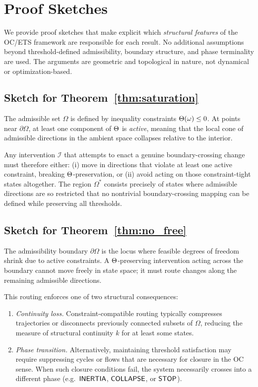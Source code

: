 ﻿\section{Proof Sketches}

We provide proof sketches that make explicit which \emph{structural features} of
the OC/ETS framework are responsible for each result.
No additional assumptions beyond threshold-defined admissibility, boundary
structure, and phase terminality are used.
The arguments are geometric and topological in nature, not dynamical or
optimization-based.

\subsection{Sketch for Theorem~\ref{thm:saturation}}

The admissible set $\Omega$ is defined by inequality constraints
$\Theta(\omega)\le 0$.
At points near $\partial\Omega$, at least one component of $\Theta$ is
\emph{active}, meaning that the local cone of admissible directions in the
ambient space collapses relative to the interior.

Any intervention $\mathcal{I}$ that attempts to enact a genuine
boundary-crossing change must therefore either:
(i) move in directions that violate at least one active constraint, breaking
$\Theta$-preservation, or
(ii) avoid acting on those constraint-tight states altogether.
The region $\Omega^\ast$ consists precisely of states where admissible
directions are so restricted that no nontrivial boundary-crossing mapping can be
defined while preserving all thresholds.

\subsection{Sketch for Theorem~\ref{thm:no_free}}

The admissibility boundary $\partial\Omega$ is the locus where feasible degrees
of freedom shrink due to active constraints.
A $\Theta$-preserving intervention acting across the boundary cannot move
freely in state space; it must route changes along the remaining admissible
directions.

This routing enforces one of two structural consequences:
\begin{enumerate}
\item \emph{Continuity loss.}
Constraint-compatible routing typically compresses trajectories or disconnects
previously connected subsets of $\Omega$, reducing the measure of structural
continuity $k$ for at least some states.
\item \emph{Phase transition.}
Alternatively, maintaining threshold satisfaction may require suppressing
cycles or flows that are necessary for closure in the OC sense.
When such closure conditions fail, the system necessarily crosses into a
different phase (e.g.\ $\mathsf{INERTIA}$, $\mathsf{COLLAPSE}$, or $\mathsf{STOP}$).
\end{enumerate}


